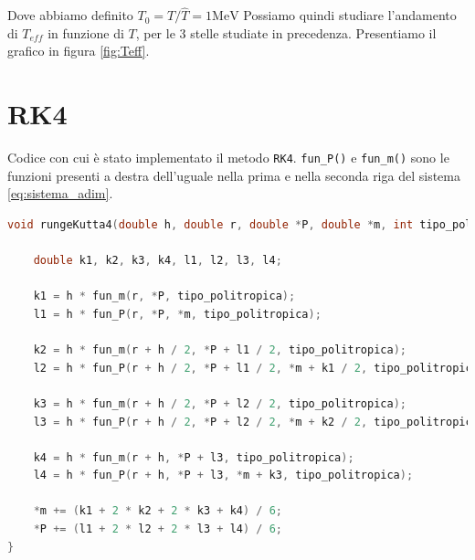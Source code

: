 \documentclass[a4paper, titlepage]{article}
\begin{document}
Dove abbiamo definito $T_0 = T / \hat T = 1 \unit{\mega\electronvolt}$
Possiamo quindi studiare l'andamento di $T_{eff}$ in funzione di $T$, per le 3 stelle studiate in precedenza. Presentiamo il grafico in figura \ref{fig:Teff}.



















\newpage
\appendix

\section{RK4} \label{ap:RK4}
Codice con cui è stato implementato il metodo \texttt{RK4}. \texttt{fun\_P()} e \texttt{fun\_m()} sono le funzioni presenti a destra dell'uguale nella prima e nella seconda riga del sistema \ref{eq:sistema_adim}.

\begin{lstlisting}[language=C]
void rungeKutta4(double h, double r, double *P, double *m, int tipo_politropica){

    double k1, k2, k3, k4, l1, l2, l3, l4;

    k1 = h * fun_m(r, *P, tipo_politropica);
    l1 = h * fun_P(r, *P, *m, tipo_politropica);

    k2 = h * fun_m(r + h / 2, *P + l1 / 2, tipo_politropica);
    l2 = h * fun_P(r + h / 2, *P + l1 / 2, *m + k1 / 2, tipo_politropica);

    k3 = h * fun_m(r + h / 2, *P + l2 / 2, tipo_politropica);
    l3 = h * fun_P(r + h / 2, *P + l2 / 2, *m + k2 / 2, tipo_politropica);

    k4 = h * fun_m(r + h, *P + l3, tipo_politropica);
    l4 = h * fun_P(r + h, *P + l3, *m + k3, tipo_politropica);

    *m += (k1 + 2 * k2 + 2 * k3 + k4) / 6;
    *P += (l1 + 2 * l2 + 2 * l3 + l4) / 6;
}
\end{lstlisting}
\end{document}
